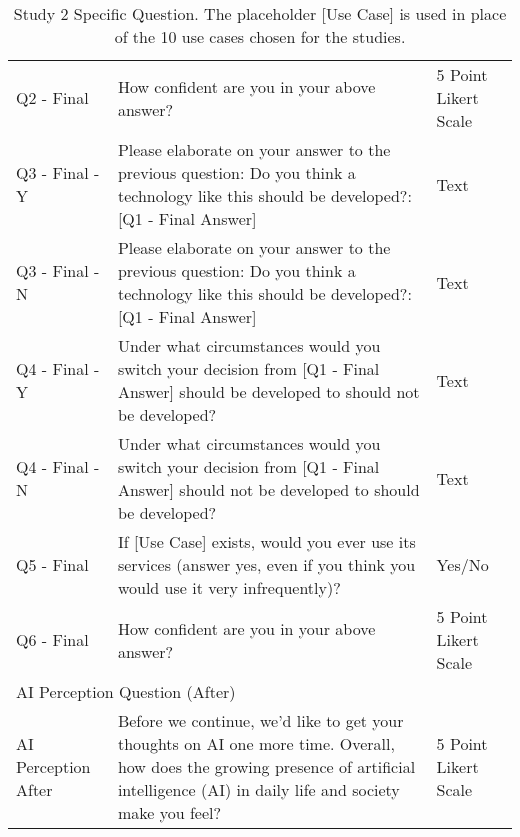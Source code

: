 \begin{table}[!hbpt]
\begin{tabularx}{\linewidth}{l|X|l}
         Q2 - Final & How confident are you in your above answer? & 5 Point Likert Scale \\
         Q3 - Final - Y & Please elaborate on your answer to the previous question: Do you think a technology like this should be developed?: [Q1 - Final Answer] & Text \\
         Q3 - Final - N & Please elaborate on your answer to the previous question: Do you think a technology like this should be developed?: [Q1 - Final Answer] & Text \\
         Q4 - Final - Y & Under what circumstances would you switch your decision from [Q1 - Final Answer] should be developed to should not be developed? & Text \\
         Q4 - Final - N & Under what circumstances would you switch your decision from [Q1 - Final Answer] should not be developed to should be developed? & Text \\ 
         Q5 - Final & If [Use Case] exists, would you ever use its services (answer yes, even if you think you would use it very infrequently)? & Yes/No \\
         Q6 - Final & How confident are you in your above answer? & 5 Point Likert Scale \\
         \midrule
         \multicolumn{3}{l}{AI Perception Question (After)}\\
         \midrule
         AI Perception After & Before we continue, we’d like to get your thoughts on AI one more time. Overall, how does the growing presence of artificial intelligence (AI) in daily life and society make you feel? & 5 Point Likert Scale \\
    \bottomrule
    \end{tabularx}
    \caption{Study 2 Specific Question. The placeholder [Use Case] is used in place of the 10 use cases chosen for the studies.}
    \label{app:part-2-questions}
\end{table}